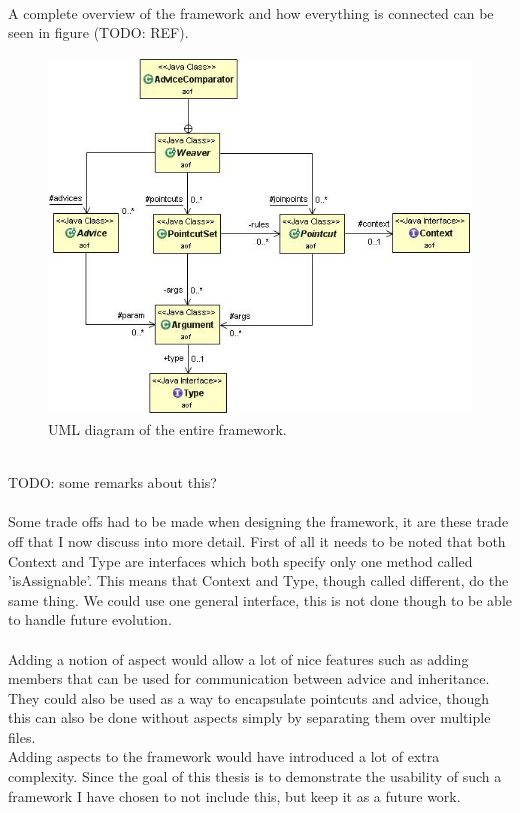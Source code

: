 \documentclass[a4paper]{report}
\begin{document}
\\
A complete overview of the framework and how everything is connected can be seen in figure (TODO: REF).
\begin{figure}
\centering
\includegraphics[scale=0.65]{images/AOF/Full.jpg}
\caption{UML diagram of the entire framework.}
\label{fig:FullView}
\end{figure}
\\
TODO: some remarks about this?\\
\\
Some trade offs had to be made when designing the framework, it are these trade off that I now discuss into more detail. First of all it needs to be noted that both Context and Type are interfaces which both specify only one method called 'isAssignable'. This means that Context and Type, though called different, do the same thing. We could use one general interface, this is not done though to be able to handle future evolution.\\
\\
Adding a notion of aspect would allow a lot of nice features such as adding members that can be used for communication between advice and inheritance. They could also be used as a way to encapsulate pointcuts and advice, though this can also be done without aspects simply by separating them over multiple files.\\
Adding aspects to the framework would have introduced a lot of extra complexity. Since the goal of this thesis is to demonstrate the usability of such a framework I have chosen to not include this, but keep it as a future work.\\
\end{document}
